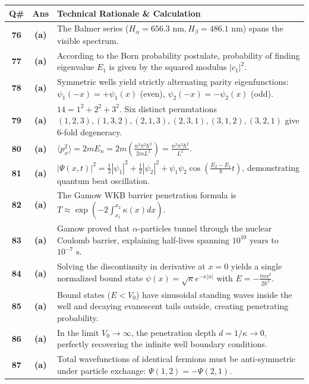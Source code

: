 {\small
\noindent\begin{tabularx}{\textwidth}{|c|c|X|}
\hline
\textbf{Q\#} & \textbf{Ans} & \textbf{Technical Rationale \& Calculation} \\
\hline
\textbf{76} & \textbf{(a)} & The Balmer series ($H_\alpha = 656.3\text{ nm}, H_\beta = 486.1\text{ nm}$) spans the visible spectrum. \\ \hline
\textbf{77} & \textbf{(a)} & According to the Born probability postulate, probability of finding eigenvalue $E_1$ is given by the squared modulus $|c_1|^2$. \\ \hline
\textbf{78} & \textbf{(a)} & Symmetric wells yield strictly alternating parity eigenfunctions: $\psi_1(-x) = +\psi_1(x)$ (even), $\psi_2(-x) = -\psi_2(x)$ (odd). \\ \hline
\textbf{79} & \textbf{(a)} & $14 = 1^2 + 2^2 + 3^2$. Six distinct permutations $(1,2,3), (1,3,2), (2,1,3), (2,3,1), (3,1,2), (3,2,1)$ give $6$-fold degeneracy. \\ \hline
\textbf{80} & \textbf{(a)} & $\langle p_x^2 \rangle = 2m E_n = 2m \left(\frac{n^2 \pi^2 \hbar^2}{2m L^2}\right) = \frac{n^2 \pi^2 \hbar^2}{L^2}$. \\ \hline
\textbf{81} & \textbf{(a)} & $|\Psi(x,t)|^2 = \frac{1}{2}|\psi_1|^2 + \frac{1}{2}|\psi_2|^2 + \psi_1\psi_2\cos(\frac{E_2-E_1}{\hbar}t)$, demonstrating quantum beat oscillation. \\ \hline
\textbf{82} & \textbf{(a)} & The Gamow WKB barrier penetration formula is $T \approx \exp(-2\int_{x_1}^{x_2} \kappa(x) dx)$. \\ \hline
\textbf{83} & \textbf{(a)} & Gamow proved that $\alpha$-particles tunnel through the nuclear Coulomb barrier, explaining half-lives spanning $10^{10}\text{ years}$ to $10^{-7}\text{ s}$. \\ \hline
\textbf{84} & \textbf{(a)} & Solving the discontinuity in derivative at $x=0$ yields a single normalized bound state $\psi(x) = \sqrt{\kappa}e^{-\kappa|x|}$ with $E = -\frac{m\alpha^2}{2\hbar^2}$. \\ \hline
\textbf{85} & \textbf{(a)} & Bound states ($E < V_0$) have sinusoidal standing waves inside the well and decaying evanescent tails outside, creating penetrating probability. \\ \hline
\textbf{86} & \textbf{(a)} & In the limit $V_0 \to \infty$, the penetration depth $d = 1/\kappa \to 0$, perfectly recovering the infinite well boundary conditions. \\ \hline
\textbf{87} & \textbf{(a)} & Total wavefunctions of identical fermions must be anti-symmetric under particle exchange: $\Psi(1,2) = -\Psi(2,1)$. \\ \hline

\end{tabularx}}
